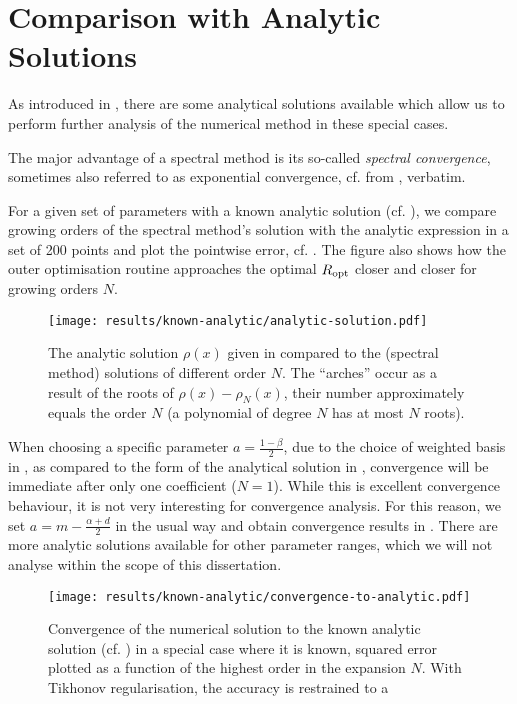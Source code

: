 \section{Comparison with Analytic Solutions}
As introduced in , there are some analytical solutions available which allow us to perform further analysis of the numerical method in these special cases.

The major advantage of a spectral method is its so-called \textit{spectral convergence}, sometimes also referred to as exponential convergence, cf.  from \cite{2023-damtp-spectral-methods}, verbatim.


For a given set of parameters with a known analytic solution (cf. ), we compare growing orders of the spectral method's solution with the analytic expression in a set of 200 points and plot the pointwise error, cf. .
The figure also shows how the outer optimisation routine approaches the optimal $R_{\rm opt}$ closer and closer for growing orders $N$.

\begin{figure}[H]
  \centering
  \texttt{[image: results/known-analytic/analytic-solution.pdf]}
  \caption[Comparison with analytical solutions and error]{
    The analytic solution $\rho(x)$ given in  compared to the (spectral method) solutions of different order $N$.
    The ``arches'' occur as a result of the roots of $\rho(x) - \rho_N(x)$, their number approximately equals the order $N$ (a polynomial of degree $N$ has at most $N$ roots).
  }
  \label{fig:analytic-solution}
\end{figure}

When choosing a specific parameter $a = \frac{1-\beta}{2}$, due to the choice of weighted basis in , as compared to the form of the analytical solution in , convergence will be immediate after only one coefficient ($N=1$).
While this is excellent convergence behaviour, it is not very interesting for convergence analysis.
For this reason, we set $a = m - \frac{\alpha+d}{2}$ in the usual way and obtain convergence results in .
There are more analytic solutions available for other parameter ranges, which we will not analyse within the scope of this dissertation.

\begin{figure}[H]
  \centering
  \texttt{[image: results/known-analytic/convergence-to-analytic.pdf]}
  \caption[Convergence to analytic solution]{Convergence of the numerical solution to the known analytic solution (cf. ) in a special case where it is known, squared error plotted as a function of the highest order in the expansion $N$. With Tikhonov regularisation, the accuracy is restrained to a }
  \label{fig:convergence-to-analytic}
\end{figure}
